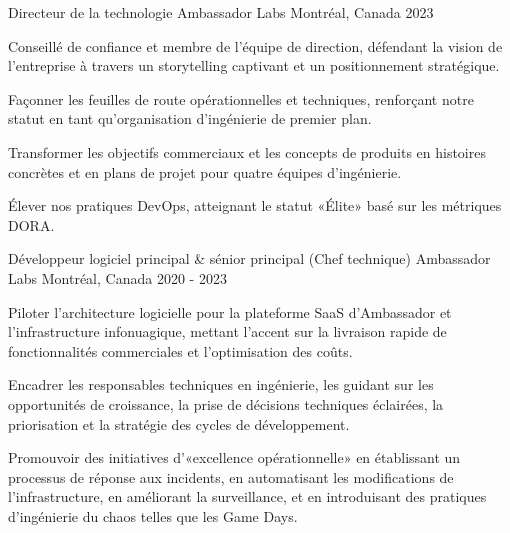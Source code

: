 
\begin{cventries}

  \cventry
    {Directeur de la technologie} %
    {Ambassador Labs} %
    {Montréal, Canada} %
    {2023} %
    {
      \begin{cvitems} %
        \item {Conseillé de confiance et membre de l'équipe de direction, défendant la vision de l'entreprise à travers un storytelling captivant et un positionnement stratégique.}
        \item {Façonner les feuilles de route opérationnelles et techniques, renforçant notre statut en tant qu'organisation d'ingénierie de premier plan.}
        \item {Transformer les objectifs commerciaux et les concepts de produits en histoires concrètes et en plans de projet pour quatre équipes d'ingénierie.}
        \item {Élever nos pratiques DevOps, atteignant le statut «Élite» basé sur les métriques DORA.}
      \end{cvitems}
    }

  \cventry
    {Développeur logiciel principal \& sénior principal (Chef technique)} %
    {Ambassador Labs} %
    {Montréal, Canada} %
    {2020 - 2023} %
    {
      \begin{cvitems} %
        \item {Piloter l'architecture logicielle pour la plateforme SaaS d'Ambassador et l'infrastructure infonuagique, mettant l'accent sur la livraison rapide de fonctionnalités commerciales et l'optimisation des coûts.}
        \item {Encadrer les responsables techniques en ingénierie, les guidant sur les opportunités de croissance, la prise de décisions techniques éclairées, la priorisation et la stratégie des cycles de développement.}
        \item {Promouvoir des initiatives d'«excellence opérationnelle» en établissant un processus de réponse aux incidents, en automatisant les modifications de l'infrastructure, en améliorant la surveillance, et en introduisant des pratiques d'ingénierie du chaos telles que les Game Days.}
      \end{cvitems}
    }


\end{cventries}
